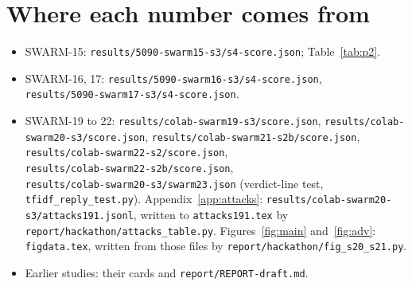 \documentclass[11pt]{article}
\begin{document}
\section{Where each number comes from}\label{app:sources}
\begin{itemize}
\item SWARM-15: \nolinkurl{results/5090-swarm15-s3/s4-score.json}; Table~\ref{tab:p2}.
\item SWARM-16, 17: \nolinkurl{results/5090-swarm16-s3/s4-score.json},\\ \nolinkurl{results/5090-swarm17-s3/s4-score.json}.
\item SWARM-19 to 22: \nolinkurl{results/colab-swarm19-s3/score.json}, \nolinkurl{results/colab-swarm20-s3/score.json},
\nolinkurl{results/colab-swarm21-s2b/score.json},\\ \nolinkurl{results/colab-swarm22-s2/score.json},\\ \nolinkurl{results/colab-swarm22-s2b/score.json},\\ \nolinkurl{results/colab-swarm20-s3/swarm23.json} (verdict-line test, \nolinkurl{tfidf_reply_test.py}). Appendix~\ref{app:attacks}: \nolinkurl{results/colab-swarm20-s3/attacks191.jsonl}, written to \nolinkurl{attacks191.tex} by \nolinkurl{report/hackathon/attacks_table.py}. Figures~\ref{fig:main} and~\ref{fig:adv}: \nolinkurl{figdata.tex}, written from those files by \nolinkurl{report/hackathon/fig_s20_s21.py}.
\item Earlier studies: their cards and \nolinkurl{report/REPORT-draft.md}.
\end{itemize}
\end{document}
